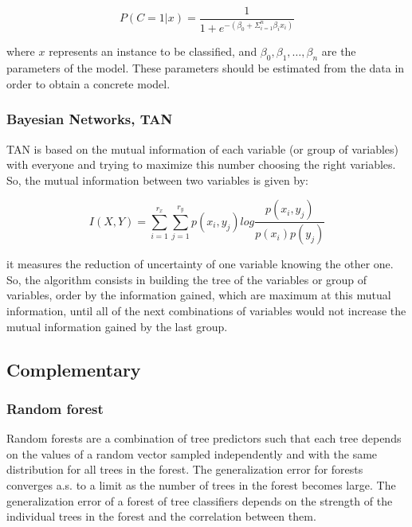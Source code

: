 \documentclass[conference,a4paper]{IEEEtran}
\begin{document}
\begin{equation}
	P(C = 1 | x) = \frac{1}{1 + e^{-(\beta_{0} + \Sigma^{n}_{i=1} \beta_{i} x_{i})}}
	\label{eq:logistic}
\end{equation}

where $x$ represents an instance to be classified, and $\beta_0, \beta_1, \dots , \beta_n$ are the parameters of the model. These parameters should be estimated from the data in order to obtain a concrete model.

\subsubsection{Bayesian Networks, TAN}

TAN is based on the mutual information of each variable (or group of variables) with everyone and trying to maximize this number choosing the right variables. So, the mutual information between two variables is given by:

\begin{equation}
	I(X,Y) = \sum_{i=1}^{r_x}\sum_{j=1}^{r_y} p(x_i, y_j) log \frac{p(x_i,y_j)}{p(x_i)p(y_j)}
	\label{eq:tan}
\end{equation}

it measures the reduction of uncertainty of one variable knowing the other one. So, the algorithm consists in building the tree of the variables or group of variables, order by the information gained, which are maximum at this mutual information, until all of the next combinations of variables would not increase the mutual information gained by the last group.

\subsection{Complementary}

\subsubsection{Random forest \cite{RandomForest}}

Random forests are a combination of tree predictors such that each tree depends on the values of a random vector sampled independently and with the same distribution for all trees in the forest. The  generalization error for forests converges a.s. to a limit as the number of trees in the forest becomes large. The generalization error of a forest of tree classifiers depends on the strength of the individual trees in the forest and the correlation between them.
\end{document}
